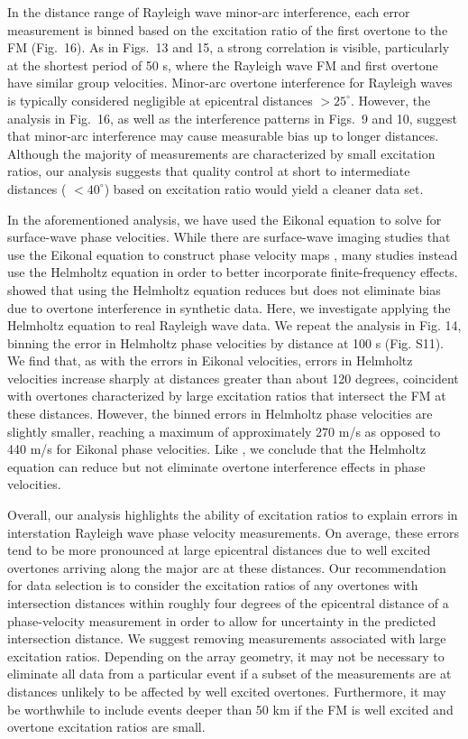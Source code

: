 \documentclass[extra,mreferee]{gji}
\begin{document}
In the distance range of Rayleigh wave minor-arc interference, each error measurement is binned based on the excitation ratio of the first overtone to the FM (Fig.\ 16). As in Figs.\ 13 and 15, a strong correlation is visible, particularly at the shortest period of 50 s, where the Rayleigh wave FM and first overtone have similar group velocities.  Minor-arc overtone interference for Rayleigh waves is typically considered negligible at epicentral distances $> 25^\circ$. However, the analysis in Fig.\ 16, as well as the interference patterns in Figs.\ 9 and 10, suggest that minor-arc interference may cause measurable bias up to longer distances. Although the majority of measurements are characterized by small excitation ratios, our analysis suggests that quality control at short to intermediate distances ( $ < 40^\circ$) based on excitation ratio would yield a cleaner data set. 

In the aforementioned analysis, we have used the Eikonal equation to solve for surface-wave phase velocities. While there are surface-wave imaging studies that use the Eikonal equation to construct phase velocity maps \cite[e.g.][]{ball2016lithospheric,gama2021shear,lehujeur2020validity}, many studies instead use the Helmholtz equation \citep{lin2011helmholtz} in order to better incorporate finite-frequency effects. \citet{hariharan2020evidence} showed that using the Helmholtz equation reduces but does not eliminate bias due to overtone interference in synthetic data. Here, we investigate applying the Helmholtz equation to real Rayleigh wave data. We repeat the analysis in Fig. 14, binning the error in Helmholtz phase velocities by distance at 100 s (Fig. S11). We find that, as with the errors in Eikonal velocities, errors in Helmholtz velocities increase sharply at distances greater than about 120 degrees, coincident with overtones characterized by large excitation ratios that intersect the FM at these distances. However, the binned errors in Helmholtz phase velocities are slightly smaller, reaching a maximum of approximately 270 m/s as opposed to 440 m/s for Eikonal phase velocities. Like \citet{hariharan2020evidence}, we conclude that the Helmholtz equation can reduce but not eliminate overtone interference effects in phase velocities. 

Overall, our analysis highlights the ability of excitation ratios to explain errors in interstation Rayleigh wave phase velocity measurements. On average, these errors tend to be more pronounced at large epicentral distances due to well excited overtones arriving along the major arc at these distances. Our recommendation for data selection is to consider the excitation ratios of any overtones with intersection distances within roughly four degrees of the epicentral distance of a phase-velocity measurement in order to allow for uncertainty in the predicted intersection distance. We suggest removing measurements associated with large excitation ratios. Depending on the array geometry, it may not be necessary to eliminate all data from a particular event if a subset of the measurements are at distances unlikely to be affected by well excited overtones. Furthermore, it may be worthwhile to include events deeper than 50 km if the FM is well excited and overtone excitation ratios are small. 
\end{document}
